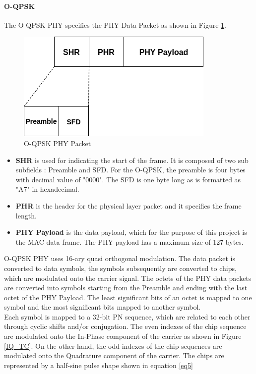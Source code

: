 \paragraph{\ac{O-QPSK}}

The O-QPSK PHY specifies the PHY Data Packet as shown in Figure \ref{OQPSK_packet}.

\begin{figure}[h!]
\centering
\includegraphics[scale=0.6]{Figure/OQPSK.png}
\caption{O-QPSK PHY Packet}
\label{OQPSK_packet}
\end{figure}

\begin{itemize}
\item{ \textbf{\ac{SHR}} is used for indicating the start of the frame. 
It is composed of two sub subfields : Preamble and \ac{SFD}.
For the O-QPSK, the preamble is four bytes with decimal value of "0000".
The SFD is one byte long as is formatted as "A7" in hexadecimal.}
\item{ \textbf{PHR} is the header for the physical layer packet and it specifies the frame length.}
\item{ \textbf{PHY Payload} is the data payload, which for the purpose of this project is the MAC data frame.
The PHY payload has a maximum size of 127 bytes.}
\end{itemize}
 

O-QPSK PHY uses 16-ary quasi orthogonal modulation.
The data packet is converted to data symbols, the symbols subsequently are converted to chips, which are modulated onto the carrier signal.
The octets of the PHY data packets are converted into symbols starting from the Preamble and ending with the last octet of the PHY Payload.
The least significant bits of an octet is mapped to one symbol and the most significant bits mapped to another symbol.\\

Each symbol is mapped to a 32-bit \ac{PN} sequence, which are related to each other through cyclic shifts and/or conjugation.
The even indexes of the chip sequence are modulated onto the In-Phase component of the carrier as shown in Figure \ref{IQ_TC}.
On the other hand, the odd indexes of the chip sequences are modulated onto the Quadrature component of the carrier.
The chips are represented by a half-sine pulse shape shown in equation \ref{eq5}

